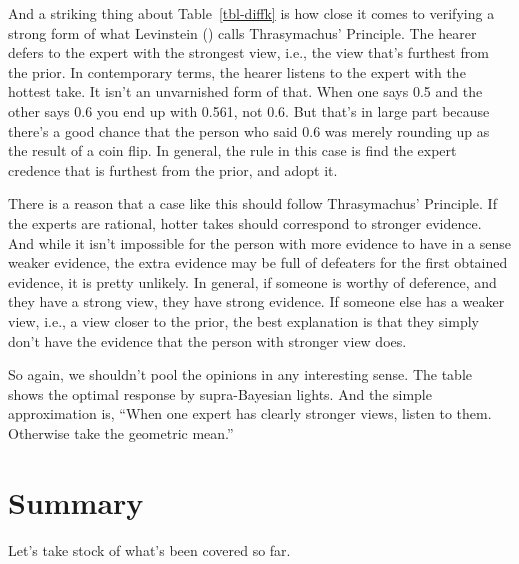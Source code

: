 \documentclass[
  10pt,
  letterpaper,
  DIV=11,
  numbers=noendperiod,
  twoside]{scrartcl}
\begin{document}
And a striking thing about Table~\ref{tbl-diffk} is how close it comes
to verifying a strong form of what Levinstein
() calls Thrasymachus' Principle. The
hearer defers to the expert with the strongest view, i.e., the view
that's furthest from the prior. In contemporary terms, the hearer
listens to the expert with the hottest take. It isn't an unvarnished
form of that. When one says 0.5 and the other says 0.6 you end up with
0.561, not 0.6. But that's in large part because there's a good chance
that the person who said 0.6 was merely rounding up as the result of a
coin flip. In general, the rule in this case is find the expert credence
that is furthest from the prior, and adopt it.

There is a reason that a case like this should follow Thrasymachus'
Principle. If the experts are rational, hotter takes should correspond
to stronger evidence. And while it isn't impossible for the person with
more evidence to have in a sense weaker evidence, the extra evidence may
be full of defeaters for the first obtained evidence, it is pretty
unlikely. In general, if someone is worthy of deference, and they have a
strong view, they have strong evidence. If someone else has a weaker
view, i.e., a view closer to the prior, the best explanation is that
they simply don't have the evidence that the person with stronger view
does.

So again, we shouldn't pool the opinions in any interesting sense. The
table shows the optimal response by supra-Bayesian lights. And the
simple approximation is, ``When one expert has clearly stronger views,
listen to them. Otherwise take the geometric mean.''

\section{Summary}\label{summary}

Let's take stock of what's been covered so far.
\end{document}
